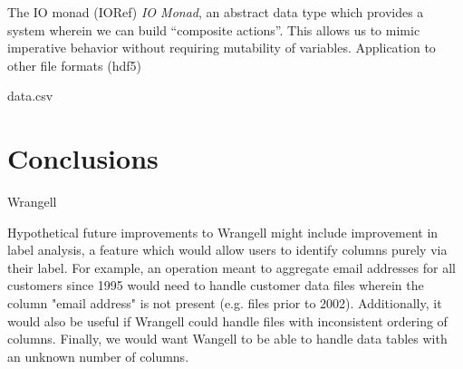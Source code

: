 \documentclass[preprint,nocopyrightspace]{sig-alternate}
\begin{document}
The IO monad (IORef)
 \emph{IO Monad}, an abstract data type which provides a system wherein we can build ``composite actions''. This allows us to mimic imperative behavior without requiring mutability of variables.  
Application to other file formats (hdf5)

data.csv



\section{Conclusions}
Wrangell 


Hypothetical future improvements to Wrangell might include improvement in label analysis, a feature which would allow users to identify columns purely via their label. For example, an operation meant to aggregate email addresses for all customers since 1995 would need to handle customer data files wherein the column "email address" is not present (e.g. files prior to 2002). Additionally, it would also be useful if Wrangell could handle files with inconsistent ordering of columns. Finally, we would want Wangell to be able to handle data tables with an unknown number of columns. 




\end{document}
